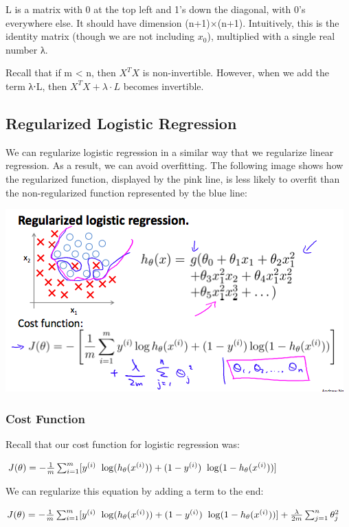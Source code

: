 \documentclass[
]{article}
\begin{document}
L is a matrix with 0 at the top left and 1's down the diagonal, with 0's
everywhere else. It should have dimension (n+1)×(n+1). Intuitively, this
is the identity matrix (though we are not including \(x_0\)), multiplied
with a single real number λ.

Recall that if m \textless{} n, then \(X^TX\) is non-invertible.
However, when we add the term λ⋅L, then \(X^TX + λ⋅L\) becomes
invertible.

\hypertarget{regularized-logistic-regression}{%
\subsection{Regularized Logistic
Regression}\label{regularized-logistic-regression}}

We can regularize logistic regression in a similar way that we
regularize linear regression. As a result, we can avoid overfitting. The
following image shows how the regularized function, displayed by the
pink line, is less likely to overfit than the non-regularized function
represented by the blue line:

\includegraphics{RegLogReg.png}

\hypertarget{cost-function-1}{%
\subsubsection{Cost Function}\label{cost-function-1}}

Recall that our cost function for logistic regression was:

\(J(\theta) = - \frac{1}{m} \sum_{i=1}^m \large[ y^{(i)}\ \log (h_\theta (x^{(i)})) + (1 - y^{(i)})\ \log (1 - h_\theta(x^{(i)})) \large]\)

We can regularize this equation by adding a term to the end:

\(J(\theta) = - \frac{1}{m} \sum_{i=1}^m \large[ y^{(i)}\ \log (h_\theta (x^{(i)})) + (1 - y^{(i)})\ \log (1 - h_\theta(x^{(i)}))\large] + \frac{\lambda}{2m}\sum_{j=1}^n \theta_j^2\)
\end{document}

